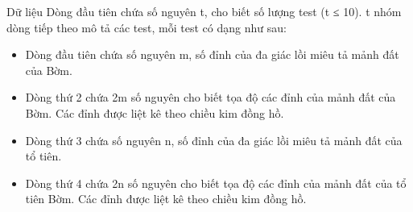 Dữ liệu
Dòng đầu tiên chứa số nguyên t, cho biết số lượng test (t ≤ 10). t nhóm dòng tiếp theo mô tả các test, mỗi test có dạng như sau:  
\begin{itemize}
	\item     Dòng đầu tiên chứa số nguyên m, số đỉnh của đa giác lồi miêu tả mảnh đất của Bờm.   
	\item     Dòng thứ 2 chứa 2m số nguyên cho biết tọa độ các đỉnh của mảnh đất của Bờm. Các đỉnh được liệt kê theo chiều kim đồng hồ.   
	\item     Dòng thứ 3 chứa số nguyên n, số đỉnh của đa giác lồi miêu tả mảnh đất của tổ tiên.   
	\item     Dòng thứ 4 chứa 2n số nguyên cho biết tọa độ các đỉnh của mảnh đất của tổ tiên Bờm. Các đỉnh được liệt kê theo chiều kim đồng hồ.   
\end{itemize}